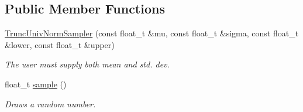 \subsection*{Public Member Functions}
\begin{DoxyCompactItemize}
\item 
\hyperlink{classrvsamp_1_1TruncUnivNormSampler_a937288fd46dcfef2f88de8081bb13752}{Trunc\+Univ\+Norm\+Sampler} (const float\+\_\+t \&mu, const float\+\_\+t \&sigma, const float\+\_\+t \&lower, const float\+\_\+t \&upper)
\begin{DoxyCompactList}\small\item\em The user must supply both mean and std. dev. \end{DoxyCompactList}\item 
float\+\_\+t \hyperlink{classrvsamp_1_1TruncUnivNormSampler_a2d6a8f2053e4ed0806718e6749288dce}{sample} ()
\begin{DoxyCompactList}\small\item\em Draws a random number. \end{DoxyCompactList}\end{DoxyCompactItemize}
